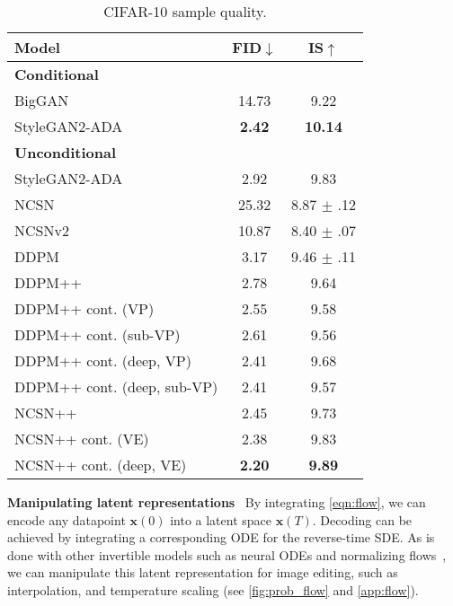 \documentclass{article} \usepackage{iclr2021_conference,times}
\newcommand{\bfx}{\mathbf{x}}
\begin{document}
\begin{table}
\begin{minipage}[t]{0.48\textwidth}
\begin{table}[H]
\centering
\caption{CIFAR-10 sample quality.}\label{tab:fid}\vspace{-1em}
\footnotesize
 \setlength\tabcolsep{3.5pt}
\begin{adjustbox}{max width=\textwidth}
  \begin{tabular}{lcc}
    \toprule
    Model & FID$\downarrow$ & IS$\uparrow$  \\
        \midrule
      {\bf Conditional} & & \\
      \midrule
      BigGAN~\citep{brock2018large} & 14.73 & 9.22 \\
      StyleGAN2-ADA~\citep{karras2020training} & \textbf{2.42} & \textbf{10.14} \\
      \midrule
      {\bf Unconditional} & & \\
      \midrule
      StyleGAN2-ADA~\citep{karras2020training} & 2.92 & 9.83 \\
      NCSN~\citep{song2019generative} & 25.32 & 8.87 $\pm$ .12 \\
      NCSNv2~\citep{song2020improved} & 10.87 & 8.40 $\pm$ .07\\
      DDPM~\citep{ho2020denoising} & 3.17 & 9.46 $\pm$ .11\\
      \midrule
      DDPM++ & 2.78 & 9.64\\
      DDPM++ cont. (VP) & 2.55 & 9.58 \\
      DDPM++ cont. (sub-VP) & 2.61 & 9.56 \\
      DDPM++ cont. (deep, VP) & 2.41 & 9.68\\
      DDPM++ cont. (deep, sub-VP) & 2.41 & 9.57\\
      NCSN++ & 2.45 & 9.73 \\
      NCSN++ cont. (VE) & 2.38 & 9.83\\
      NCSN++ cont. (deep, VE) & \textbf{2.20} & \textbf{9.89}\\
    \bottomrule 
    \end{tabular}
\end{adjustbox}
\end{table}
\end{minipage}
\end{table}

\textbf{Manipulating latent representations}~ By integrating \cref{eqn:flow}, we can encode any datapoint $\bfx(0)$ into a latent space $\bfx(T)$. Decoding can be achieved by integrating a corresponding ODE for the reverse-time SDE. As is done with other invertible models such as neural ODEs and normalizing flows~\citep{dinh2016density,kingma2018glow}, we can manipulate this latent representation for image editing, such as interpolation, and temperature scaling (see \cref{fig:prob_flow} and \cref{app:flow}). 
\end{document}
